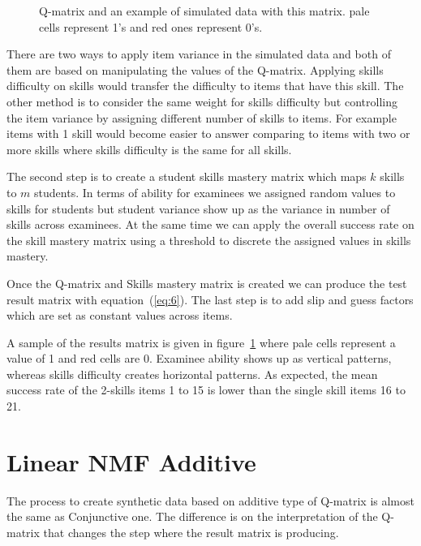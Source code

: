 \begin{figure}[ht]
\centering

\quad
\caption{Q-matrix and an example of simulated data with this matrix.  pale cells represent 1's and red ones represent 0's.}
\label{figqmatrixandResutM}
\end{figure}

There are two ways to apply item variance in the simulated data and both of them are based on manipulating the values of the Q-matrix. Applying skills difficulty on skills would transfer the difficulty to items that have this skill. The other method is to consider the same weight for skills difficulty but controlling the item variance by assigning different number of skills to items. For example items with 1 skill would become easier to answer comparing to items with two or more skills where skills difficulty is the same for all skills. 

The second step is to create a student skills mastery matrix which maps $k$ skills to $m$ students. In terms of ability for examinees we assigned random values to skills for students but  student variance show up as the variance in number of skills across examinees. At the same time we can apply the overall success rate on the skill mastery matrix using a threshold to discrete the assigned values in skills mastery. 

Once the Q-matrix and Skills mastery matrix is created we can produce the test result matrix with equation~(\ref{eq:6}). The last step is to add slip and guess factors which are set as constant values across items.

A sample of the results matrix is given in figure~\ref{figqmatrixandResutM} where pale cells represent a value of 1 and red cells are 0. Examinee ability shows up as vertical patterns, whereas skills difficulty creates horizontal patterns. As expected, the mean success rate of the 2-skills items 1 to 15 is lower than the single skill items 16 to 21.

\section{Linear NMF Additive}

The process to create synthetic data based on additive type of Q-matrix is almost the same as Conjunctive one. The difference is on the interpretation of the Q-matrix that changes the step where the result matrix is producing.

